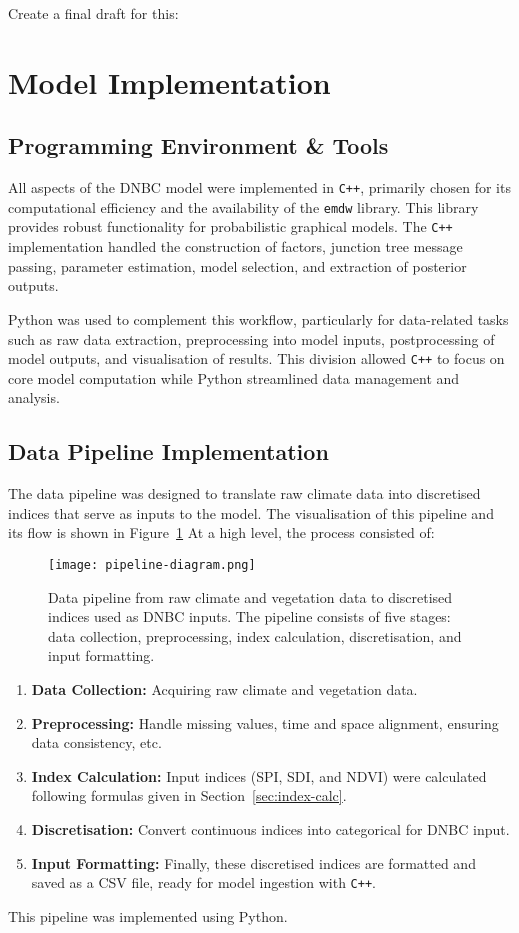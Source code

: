 Create a final draft for this:

\section{Model Implementation}
\label{sec:model_implementation}

\subsection{Programming Environment \& Tools}
All aspects of the DNBC model were implemented in \texttt{C++}, primarily chosen for its computational efficiency and the availability of the \texttt{emdw} library. This library provides robust functionality for probabilistic graphical models. The \texttt{C++} implementation handled the construction of factors, junction tree message passing, parameter estimation, model selection, and extraction of posterior outputs.  

Python was used to complement this workflow, particularly for data-related tasks such as raw data extraction, preprocessing into model inputs, postprocessing of model outputs, and visualisation of results. This division allowed \texttt{C++} to focus on core model computation while Python streamlined data management and analysis.

\subsection{Data Pipeline Implementation}
The data pipeline was designed to translate raw climate data into discretised indices that serve as inputs to the model. The visualisation of this pipeline and its flow is shown in Figure~\ref{fig:pipeline-diagram}
At a high level, the process consisted of:

\begin{figure}[!h]
    \centering
    \texttt{[image: pipeline-diagram.png]}
    \caption[Data Pipeline For DNBC Inputs]{Data pipeline from raw climate and vegetation data to discretised indices used as DNBC inputs. The pipeline consists of five stages: data collection, preprocessing, index calculation, discretisation, and input formatting.}
    \label{fig:pipeline-diagram}
\end{figure}

\begin{enumerate}
    \item \textbf{Data Collection:} Acquiring raw climate and vegetation data.
    \item \textbf{Preprocessing:} Handle missing values, time and space alignment, ensuring data consistency, etc.
    \item \textbf{Index Calculation:} Input indices (SPI, SDI, and NDVI) were calculated following formulas given in Section~\ref{sec:index-calc}.
    \item \textbf{Discretisation:} Convert continuous indices into categorical for DNBC input.
    \item \textbf{Input Formatting:} Finally, these discretised indices are formatted and saved as a CSV file, ready for model ingestion with \texttt{C++}.
\end{enumerate}
This pipeline was implemented using Python.

